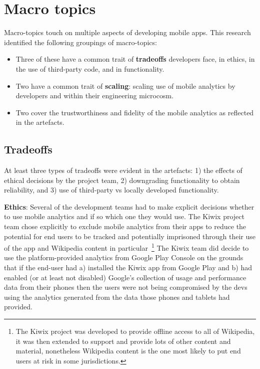 \section{Macro topics}
Macro-topics touch on multiple aspects of developing mobile apps. This research identified the following groupings of macro-topics:

\begin{itemize}
    \item Three of these have a common trait of \textbf{tradeoffs} developers face, in ethics, in the use of third-party code, and in functionality.
    \item Two have a common trait of \textbf{scaling}: scaling use of mobile analytics by developers and within their engineering microcosm.
    \item Two cover the trustworthiness and fidelity of the mobile analytics as reflected in the artefacts. 
\end{itemize}

\subsection{Tradeoffs}
At least three types of tradeoffs were evident in the artefacts: 1) the effects of ethical decisions by the project team, 2) downgrading functionality to obtain reliability, and 3) use of third-party vs locally developed functionality. 

\textbf{Ethics}: 
Several of the development teams had to make explicit decisions whether to use mobile analytics and if so which one they would use. The Kiwix project team chose explicitly to exclude mobile analytics from their apps to reduce the potential for end users to be tracked and potentially imprisoned through their use of the app and Wikipedia content in particular~\footnote{The Kiwix project was developed to provide offline access to all of Wikipedia, it was then extended to support and provide lots of other content and material, nonetheless Wikipedia content is the one most likely to put end users at risk in some jurisdictions.} The Kiwix team did decide to use the platform-provided analytics from Google Play Console on the grounds that if the end-user had a) installed the Kiwix app from Google Play and b) had enabled (or at least not disabled) Google's collection of usage and performance data from their phones then the users were not being compromised by the devs using the analytics generated from the data those phones and tablets had provided.

